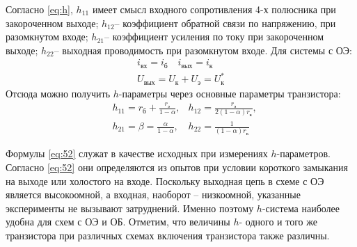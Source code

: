 Согласно \eqref{eq:h}, $h_{11}$ имеет смысл входного сопротивления 4-х полюсника при закороченном выходе; $h_{12}$-- коэффициент обратной связи по напряжению,
при разомкнутом входе; $h_{21}$-- коэффициент усиления по току при закороченном выходе; $h_{22}$-- выходная проводимость при разомкнутом входе.
Для системы с ОЭ:
\begin{equation}
    \label{eq:52}
    \begin{aligned}
        i_{\text{вх}}=i_{\text{б}} \quad
        i_{\text{вых}}=i_{\text{к}}\\
        U_{\text{вых}}=U_{\text{к}}+U_{\text{э}}=U_{\text{к}}^*
    \end{aligned}
\end{equation}
Отсюда можно получить $h$-параметры через основные параметры транзистора:
\begin{equation}
    \begin{aligned}
        \label{eq:53}
        &h_{11}=r_{\text{б}} + \frac{r_{\text{э}}}{1- \alpha},
        &h_{12}=\frac{r_{\text{э}}}{2(1-\alpha)r_{\text{к}}},\\
        &h_{21}=\beta=\frac{\alpha}{1-\alpha},
        &h_{22}= \frac{1}{(1-\alpha)r_{\text{к}}}
    \end{aligned}
\end{equation}

Формулы \eqref{eq:52} служат в качестве исходных при измерениях $h$-параметров. Согласно \eqref{eq:52} они определяются
из опытов при условии короткого замыкания на выходе или холостого на входе. Поскольку выходная цепь в схеме с ОЭ
является высокоомной, а входная, наоборот -- низкоомной, указанные эксперименты не вызывают затруднений. Именно
поэтому $h$-система наиболее удобна для схем с ОЭ и ОБ. Отметим, что величины $h$- одного и того же транзистора 
при различных схемах включения транзистора также различны.

